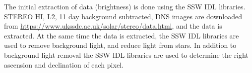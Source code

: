 The initial extraction of data (brightness) is done using the SSW IDL libraries. STEREO HI, L2, 11 day background subtracted, DNS images are downloaded from \url{https://www.ukssdc.ac.uk/solar/stereo/data.html}, and the data is extracted. At the same time the data is extracted, the SSW IDL libraries are used to remove background light, and reduce light from stars. In addition to background light removal the SSW IDL libraries are used to determine the right ascension and declination of each pixel. %